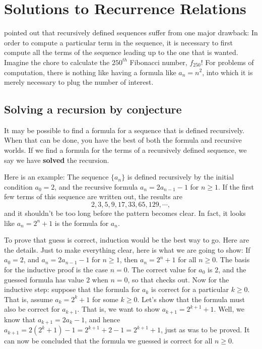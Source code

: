 \chapter{Solutions to Recurrence Relations}\label{chpt:solns to recur rels}

 pointed out that 
recursively defined
sequences suffer from one major drawback: In order to compute a
particular term in the sequence, it is necessary to first compute all
the terms of the sequence leading up to the one that is wanted. Imagine
the chore to calculate the $250^{th}$ Fibonacci number, $f_{250}$! For
problems of computation, there is nothing like having a formula like
$a_n= n^2$, into which it is merely necessary to plug the number of
interest.

\section{Solving a recursion by conjecture}
It may be possible to find a formula for a sequence that is
defined recursively. When that can be done, you have the best of both
the formula and recursive worlds.  If we find a formula for the
terms of a recursively defined sequence, we say we have {\bfseries solved}
the recursion.


\begin{exmp}\label{exmp: recur a_n=2a_{n-1}+1}
 Here is an example: The sequence
 $\{a_n\}$ is defined recursively by the initial condition $a_0=2$, and
 the recursive formula $a_n=2a_{n-1}-1$ for $n\geq1$. If
 the first few terms of this sequence are written out, the results are
 \[
 2,3,5,9,17,33,65,129,\cdots,
 \]
  and it shouldn't be too long before the
 pattern becomes clear. In fact, it looks like $a_n=2^n+1$ is the formula
 for $a_n$.
 
 To prove that guess is correct, induction would be the best way to
 go. Here are the details. Just to make everything clear, here is what we
 are going to show: If $a_0=2$, and $a_n=2a_{n-1}-1$ for $n\geq1$, then
 $a_n=2^n+1$ for all $n\geq0$. The basis for the inductive proof is the
 case $n=0$. The correct value for $a_0$ is $2$, and the guessed formula
 has value $2$ when $n=0$, so that checks out. Now for the inductive step:
 suppose that the formula for $a_k$ is correct for a particular
 $k\geq0$. That is, assume $a_k=2^k+1$ for some $k\geq0$. Let's show that the formula must
 also be correct for $a_{k+1}$.  That is, we want to show
 $a_{k+1}=2^{k+1}+1$. Well, we know that $a_{k+1}=2a_k-1$, and hence
 $a_{k+1}=2(2^k+1)-1=2^{k+1}+2-1=2^{k+1}+1$, just as was to be proved.
 It can now be concluded that the formula we guessed is correct for all
 $n\geq0$.
\end{exmp}


